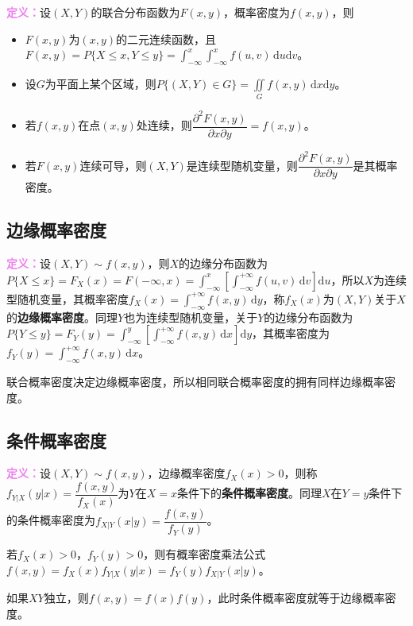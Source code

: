 \textcolor{violet}{\textbf{定义：}}设$(X,Y)$的联合分布函数为$F(x,y)$，概率密度为$f(x,y)$，则

\begin{itemize}
    \item $F(x,y)$为$(x,y)$的二元连续函数，且$F(x,y)=P\{X\leqslant x,Y\leqslant y\}=\int_{-\infty}^x\int_{-\infty}^xf(u,v)\,\textrm{d}u\textrm{d}v$。
    \item 设$G$为平面上某个区域，则$P\{(X,Y)\in G\}=\iint\limits_Gf(x,y)\,\textrm{d}x\textrm{d}y$。
    \item 若$f(x,y)$在点$(x,y)$处连续，则$\dfrac{\partial^2F(x,y)}{\partial x\partial y}=f(x,y)$。
    \item 若$F(x,y)$连续可导，则$(X,Y)$是连续型随机变量，则$\dfrac{\partial^2F(x,y)}{\partial x\partial y}$是其概率密度。
\end{itemize}

\subsection{边缘概率密度}

\textcolor{violet}{\textbf{定义：}}设$(X,Y)\sim f(x,y)$，则$X$的边缘分布函数为$P\{X\leqslant x\}=F_X(x)=F(-\infty,x)=\int_{-\infty}^x\left[\int_{-\infty}^{+\infty}f(u,v)\,\textrm{d}v\right]\textrm{d}u$，所以$X$为连续型随机变量，其概率密度$f_X(x)=\int_{-\infty}^{+\infty}f(x,y)\,\textrm{d}y$，称$f_X(x)$为$(X,Y)$关于$X$的\textbf{边缘概率密度}。同理$Y$也为连续型随机变量，关于$Y$的边缘分布函数为$P\{Y\leqslant y\}=F_Y(y)=\int_{-\infty}^y[\int_{-\infty}^{+\infty}f(x,y)\,\textrm{d}x]\textrm{d}y$，其概率密度为$f_Y(y)=\int_{-\infty}^{+\infty}f(x,y)\,\textrm{d}x$。

联合概率密度决定边缘概率密度，所以相同联合概率密度的拥有同样边缘概率密度。

\subsection{条件概率密度}

\textcolor{violet}{\textbf{定义：}}设$(X,Y)\sim f(x,y)$，边缘概率密度$f_X(x)>0$，则称$f_{Y|X}(y|x)=\dfrac{f(x,y)}{f_X(x)}$为$Y$在$X=x$条件下的\textbf{条件概率密度}。同理$X$在$Y=y$条件下的条件概率密度为$f_{X|Y}(x|y)=\dfrac{f(x,y)}{f_Y(y)}$。

若$f_X(x)>0$，$f_Y(y)>0$，则有概率密度乘法公式$f(x,y)=f_X(x)f_{Y|X}(y|x)=f_Y(y)f_{X|Y}(x|y)$。

如果$XY$独立，则$f(x,y)=f(x)f(y)$，此时条件概率密度就等于边缘概率密度。


